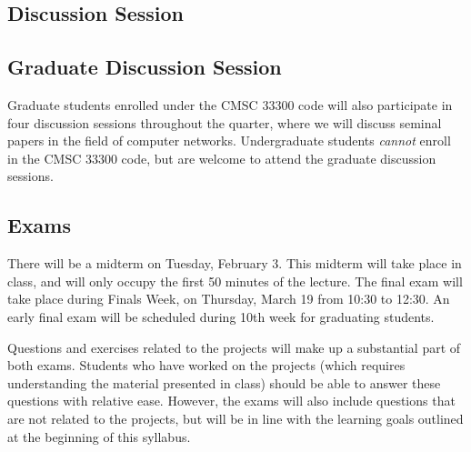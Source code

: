\documentclass[11pt]{article}
\begin{document}
\subsection{Discussion Session}



\subsection{Graduate Discussion Session}

Graduate students enrolled under the CMSC 33300 code will also participate in four discussion sessions throughout the quarter, where we will discuss seminal papers in the field of computer networks. Undergraduate students \emph{cannot} enroll in the CMSC 33300 code, but are welcome to attend the graduate discussion sessions.


\subsection{Exams}

There will be a midterm on Tuesday, February 3. This midterm will take place in class, and will only occupy the first 50 minutes of the lecture. The final exam will take place during Finals Week, on Thursday, March 19 from 10:30 to 12:30. An early final exam will be scheduled during 10th week for graduating students.

Questions and exercises related to the projects will make up a substantial part of both exams. Students who have worked on the projects (which requires understanding the material presented in class) should be able to answer these questions with relative ease. However, the exams will also include questions that are not related to the projects, but will be in line with the learning goals outlined at the beginning of this syllabus.
\end{document}
